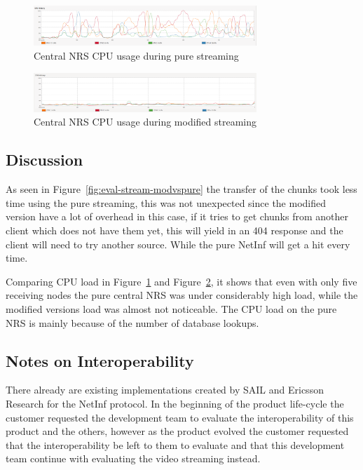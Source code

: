 \begin{figure}[h!]
	\centering
		\includegraphics[width=0.75\textwidth]{./img/eval-stream-pure-cpu.png}
    	\caption{Central NRS CPU usage during pure streaming}
	\label{fig:eval-stream-pure-cpu}
\end{figure}

\begin{figure}[h!]
	\centering
		\includegraphics[width=0.75\textwidth]{./img/eval-stream-mod-cpu.png}
    	\caption{Central NRS CPU usage during modified streaming}
	\label{fig:eval-stream-mod-cpu}
\end{figure}

\subsection{Discussion}
As seen in Figure~\ref{fig:eval-stream-modvspure} the transfer of the chunks took less time using the pure streaming, this was not unexpected since the modified version have a lot of overhead in this case, if it tries to get chunks from another client which does not have them yet, this will yield in an 404 response and the client will need to try another source. While the pure NetInf will get a hit every time. 

Comparing CPU load in Figure~\ref{fig:eval-stream-pure-cpu} and Figure~\ref{fig:eval-stream-mod-cpu}, it shows that even with only five receiving nodes the pure central NRS was under considerably high load, while the modified versions load was almost not noticeable. The CPU load on the pure NRS is mainly because of the number of database lookups. 

\subsection{Notes on Interoperability}

There already are existing implementations created by SAIL and Ericsson Research for the NetInf protocol. In the beginning of the product life-cycle the customer requested the development team to evaluate the interoperability of this product and the others, however as the product evolved the customer requested that the interoperability be left to them to evaluate and that this development team continue with evaluating the video streaming instead.

